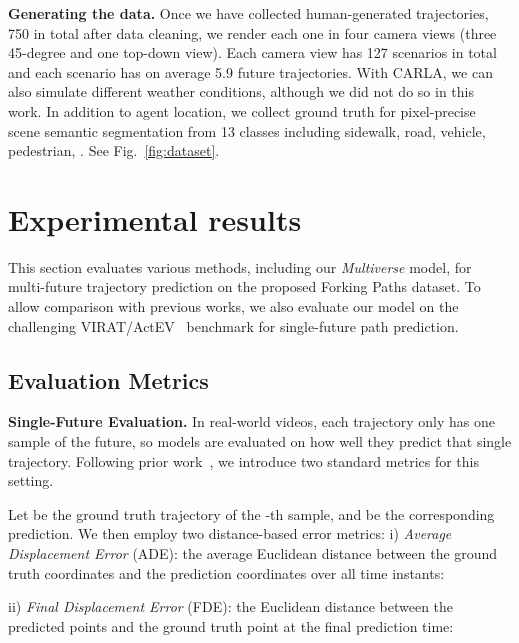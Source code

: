\documentclass[10pt,twocolumn,letterpaper]{article}
\newcommand{\fancyname}{Multiverse}\newcommand{\Tpred}{T_{\text{pred}}}
\begin{document}
\noindent\textbf{Generating the data.}
Once we have collected human-generated trajectories, 750 in total after data cleaning, 
we render each one in four camera views (three 45-degree and one top-down view). Each camera view has 127 scenarios in total and each scenario has on average 5.9 future trajectories.
With CARLA,
we can also simulate different weather conditions,
although we did not do so in this work.
In addition to agent location, we collect ground truth for pixel-precise scene semantic segmentation from 13 classes including sidewalk, road, vehicle, pedestrian, \etc. See Fig.~\ref{fig:dataset}.

 \vspace{-1mm}
\section{Experimental results}
\label{sec:exp}
\label{sec:results}
\vspace{-1mm}
This section evaluates various methods,
including our \emph{\fancyname} model,
for multi-future trajectory prediction
on the proposed Forking Paths dataset. 
To allow comparison with previous works,
we also evaluate our model on the challenging VIRAT/ActEV~\cite{2018trecvidawad,oh2011large} benchmark for single-future path prediction.


\subsection{Evaluation Metrics} 
\label{sec:metrics}

\noindent\textbf{Single-Future Evaluation.}
In real-world videos, each trajectory only has one sample of the future,
so models are evaluated on how well they predict that single trajectory.
Following prior work~\cite{liang2019peeking,alahi2016social,gupta2018social,sadeghian2018sophie,lee2017desire,hong2019rules,chai2019multipath,rhinehart2019precog}, we introduce two standard metrics for this setting.



Let  be the ground truth trajectory of the -th sample, and  be the corresponding prediction.
We then employ two distance-based error metrics: 
\noindent i) \textit{Average Displacement Error} (ADE): the average Euclidean distance between the ground truth coordinates and the prediction coordinates over all time instants:

\noindent ii) \textit{Final Displacement Error} (FDE): the Euclidean distance between the predicted points and the ground truth point at the final prediction time:
\end{document}
